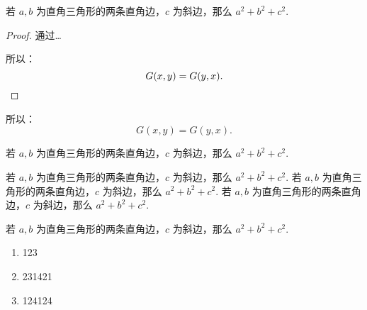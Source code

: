 \begin{texcode}[]{}
  \begin{theorem}[勾股定理]
    若 $a,b$ 为直角三角形的两条直角边，$c$ 为斜边，那么 $a^2 + b^2 + c^2.$
  \end{theorem}

  \begin{proof}
    通过\ldots

    所以：
    \begin{equation*}
        G(x, y) = G(y, x).  \qedhere
    \end{equation*}
  \end{proof}
\end{texcode}

\begin{proposition}
  所以：
  \begin{equation*}
      G(x, y) = G(y, x).
  \end{equation*}
\end{proposition}

\begin{conjecture}[勾股定理]
    若 $a,b$ 为直角三角形的两条直角边，$c$ 为斜边，那么 $a^2 + b^2 + c^2.$
\end{conjecture}

\begin{axiom}[勾股定理]
    若 $a,b$ 为直角三角形的两条直角边，$c$ 为斜边，那么 $a^2 + b^2 + c^2.$ 若 $a,b$ 为直角三角形的两条直角边，$c$ 为斜边，那么 $a^2 + b^2 + c^2.$ 若 $a,b$ 为直角三角形的两条直角边，$c$ 为斜边，那么 $a^2 + b^2 + c^2.$
\end{axiom}

\begin{definition}[勾股定理]
    若 $a,b$ 为直角三角形的两条直角边，$c$ 为斜边，那么 $a^2 + b^2 + c^2.$
\end{definition}



\begin{texcode}[]{}
  \begin{enumerate}
    \item 123
    \item 231421
    \item 124124
  \end{enumerate}
\end{texcode}



\zhlipsum[1]


\zhlipsum[2]


\zhlipsum[3]